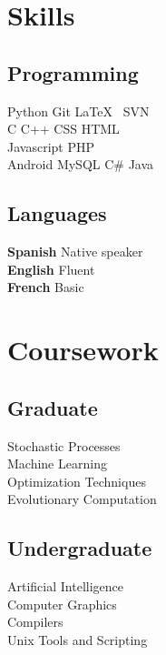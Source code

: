 \documentclass[]{resume}
\begin{document}
\begin{minipage}[t]{0.33\textwidth}

\section{Skills}

\subsection{Programming}
Python \textbullet{} Git \textbullet{} \LaTeX\ \textbullet{} SVN \\
C \textbullet{} C++ \textbullet{} CSS \textbullet{} HTML\\
Javascript \textbullet{} PHP\\
Android \textbullet{} MySQL \textbullet{} C\# \textbullet{} Java \\
\sectionsep

\subsection{Languages}
\textbf{Spanish} \textbullet{} Native speaker \\
\textbf{English} \textbullet{} Fluent \\
\textbf{French} \textbullet{} Basic \\
\sectionsep


\section{Coursework}
\subsection{Graduate}
Stochastic Processes \\
Machine Learning \\
Optimization Techniques \\
Evolutionary Computation \\
\sectionsep

\subsection{Undergraduate}
Artificial Intelligence \\
Computer Graphics \\
Compilers \\
Unix Tools and Scripting \\


\end{minipage}
\end{document}
